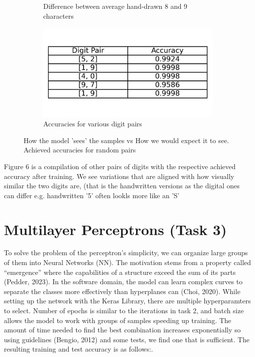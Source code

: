 \documentclass{article}
\begin{document}
\begin{figure}[h!]
\begin{subfigure}[t]{0.3\textwidth}
        \caption{Difference between average hand-drawn 8 and 9 characters}
        \label{fig:plot5b}
    \end{subfigure}
    \hspace{0.01\textwidth}
    \begin{subfigure}[t]{0.3\textwidth}
        \centering
        \includegraphics[width=\textwidth]{./plots/plot8.png}
        \caption{Accuracies for various digit pairs}
        \label{fig:plot5c}
    \end{subfigure}
    \caption{How the model 'sees' the samples vs How we would expect it to see. Achieved accuracies for random pairs}
    \label{fig:plot5}
\end{figure}

Figure 6 is a compilation of other pairs of digits with the respective achieved accuracy after training.
We see variations that are aligned with how visually similar the two digits are, (that is the handwritten versions as the digital ones can differ e.g. handwritten '5' often lookls more like an 'S'

\section{Multilayer Perceptrons (Task 3)}

To solve the problem of the perceptron’s simplicity, we can organize large groups of them into Neural Networks (NN).
The motivation stems from a property called “emergence” where the capabilities of a structure exceed the sum of its parts (Pedder, 2023).
In the software domain, the model can learn complex curves to separate the classes more effectively than hyperplanes can (Choi, 2020).
While setting up the network with the Keras Library, there are multiple hyperparamters to select. 
Number of epochs is similar to the iterations in task 2, and batch size allows the model to work with groups of samples speeding up training.
The amount of time needed to find the best combination increases exponentially so using guidelines (Bengio, 2012) and some tests, we find one that is sufficient.
The resulting training and test accuracy is as follows:.
\end{document}
